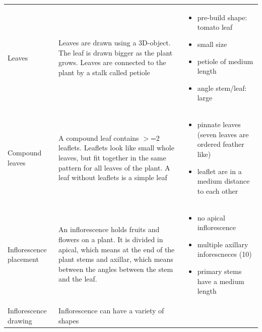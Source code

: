 \begin{longtable}[c]{@{}p{}p{}p{}@{}}
	Leaves                  & Leaves are drawn using a 3D-object. The leaf is drawn bigger as the plant grows. Leaves are connected to the plant by a stalk called petiole& \vspace{-25pt}
	\begin{itemize}
		\item pre-build shape: tomato leaf\vspace{-10pt}
		\item small size \vspace{-10pt}
		\item petiole of medium length \vspace{-10pt}
		\item angle stem/leaf: large \vspace{-10pt}
	\end{itemize} \\
	Compound leaves         & A compound leaf contains $>$=2 leaflets. Leaflets look like small whole leaves, but fit together in the same pattern for all leaves of the plant. A leaf without leaflets is a simple leaf & \vspace{-25pt}
	\begin{itemize}
		\item pinnate leaves (seven leaves are ordered feather like) \vspace{-10pt}
		\item leaflet are in a medium distance to each other \vspace{-10pt}
	\end{itemize} \\
	Inflorescence placement & An inflorescence holds fruits and flowers on a plant. It is divided in apical, which means at the end of the plant stems and axillar, which means between the angles between the stem and the leaf.         & \vspace{-25pt}
	\begin{itemize}
		\item no apical inflorescence \vspace{-10pt}
		\item multiple axillary inforescneces (10)\vspace{-10pt}
		\item primary stems have a medium length\vspace{-10pt}
	\end{itemize} \\
	Inflorescence drawing   & Inflorescence can have a variety of shapes                                                                                                                                                                                  & \vspace{-25pt}

\end{longtable}
